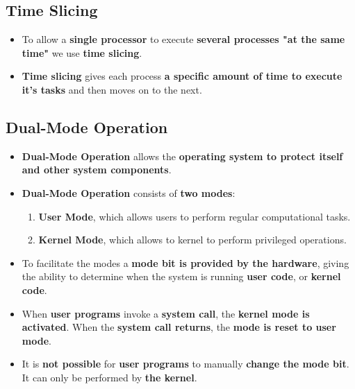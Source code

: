 \documentclass[16pt]{article}
\begin{document}
    \subsection*{Time Slicing}
    \begin{itemize}
        \item To allow a \textbf{single processor} to execute \textbf{several processes "at the same time"} we use \textbf{time slicing}.
        \item \textbf{Time slicing} gives each process \textbf{a specific amount of time to execute it's tasks} and then moves on to the next.
    \end{itemize}

    \subsection*{Dual-Mode Operation}
    \begin{itemize}
        \item \textbf{Dual-Mode Operation} allows the \textbf{operating system to protect itself and other system components}.
        \item \textbf{Dual-Mode Operation} consists of \textbf{two modes}:
        \begin{enumerate}
            \item \textbf{User Mode}, which allows users to perform regular computational tasks.
            \item \textbf{Kernel Mode}, which allows to kernel to perform privileged operations.
        \end{enumerate}
        \item To facilitate the modes a \textbf{mode bit is provided by the hardware}, giving the ability to determine when the system is running \textbf{user code}, or \textbf{kernel code}.
        \item When \textbf{user programs} invoke a \textbf{system call}, the \textbf{kernel mode is activated}. When the \textbf{system call returns}, the \textbf{mode is reset to user mode}. 
        \item It is \textbf{not possible} for \textbf{user programs} to manually \textbf{change the mode bit}. It can only be performed by \textbf{the kernel}.
    \end{itemize}
\end{document}
